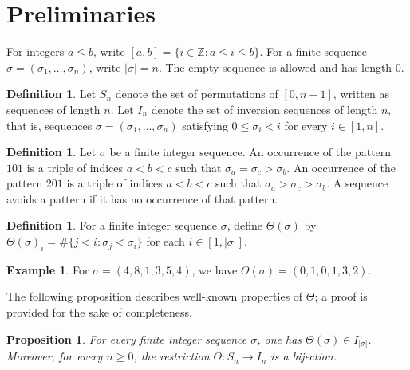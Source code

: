\documentclass[11pt]{article}
\newtheorem{prop}[thm]{Proposition}
\theoremstyle{remark}
\theoremstyle{definition}
\newtheorem{defn}[thm]{Definition}
\newtheorem{example}[thm]{Example}
\begin{document}
\section{Preliminaries}

For integers $a\leq b$, write $[a,b]=\{i\in\mathbb Z:a\leq i\leq b\}$. For a finite sequence $\sigma=(\sigma_1,\ldots,\sigma_n)$, write $|\sigma|=n$. The empty sequence is allowed and has length $0$.

\begin{defn}
Let $S_n$ denote the set of permutations of $[0,n-1]$, written as sequences of length $n$. Let $I_n$ denote the set of inversion sequences of length $n$, that is, sequences $\sigma=(\sigma_1,\ldots,\sigma_n)$ satisfying $0\leq \sigma_i<i$ for every $i\in[1,n]$.
\end{defn}

\begin{defn}
Let $\sigma$ be a finite integer sequence. An occurrence of the pattern $101$ is a triple of indices $a<b<c$ such that $\sigma_a=\sigma_c>\sigma_b$. An occurrence of the pattern $201$ is a triple of indices $a<b<c$ such that $\sigma_a>\sigma_c>\sigma_b$. A sequence avoids a pattern if it has no occurrence of that pattern.
\end{defn}

\begin{defn}
For a finite integer sequence $\sigma$, define $\Theta(\sigma)$ by $\Theta(\sigma)_i=\#\{j<i:\sigma_j<\sigma_i\}$ for each $i\in[1,|\sigma|]$.
\end{defn}

\begin{example}
For $\sigma = (4,8,1,3,5,4)$, we have $\Theta(\sigma) = (0,1,0,1,3,2)$.
\end{example}

The following proposition describes well-known properties of $\Theta$; a proof is provided for the sake of completeness.
\begin{prop}\label{prop:theta_basic}
For every finite integer sequence $\sigma$, one has $\Theta(\sigma)\in I_{|\sigma|}$. Moreover, for every $n\geq0$, the restriction $\Theta:S_n\to I_n$ is a bijection.
\end{prop}
\end{document}
